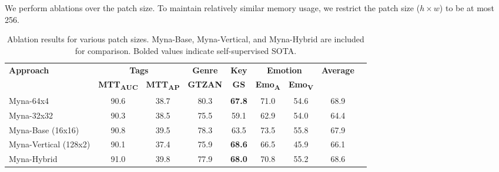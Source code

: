 We perform ablations over the patch size. To maintain relatively similar memory usage, we restrict the patch size ($h \times w$) to be at most 256. 

\begin{table*}[h]
\centering
\begin{tabular}{lcccccccc}
\toprule
\textbf{Approach} & \multicolumn{2}{c}{\textbf{Tags}} & \textbf{Genre} & \textbf{Key} & \multicolumn{2}{c}{\textbf{Emotion}} & \textbf{Average} \\
                  & \textbf{MTT\textsubscript{AUC}} & \textbf{MTT\textsubscript{AP}} & \textbf{GTZAN} & \textbf{GS} & \textbf{Emo\textsubscript{A}} & \textbf{Emo\textsubscript{V}} &  \\
\midrule
\midrule
Myna-64x4 & 90.6 & 38.7 & 80.3 & \textbf{67.8} & 71.0 & 54.6 & 68.9 \\
Myna-32x32 & 90.3 & 38.5 & 75.5 & 59.1 & 62.9 & 54.0 & 64.4 \\
\midrule
Myna-Base (16x16) & 90.8 & 39.5 & 78.3 & 63.5 & 73.5 & 55.8 & 67.9 \\
Myna-Vertical (128x2) & 90.1 & 37.4 & 75.9 & \textbf{68.6} & 66.5 & 45.9 & 66.1 \\
Myna-Hybrid & 91.0 & 39.8 & 77.9 & \textbf{68.0} & 70.8 & 55.2 & 68.6 \\ %

\bottomrule
\end{tabular}
\caption{Ablation results for various patch sizes. Myna-Base, Myna-Vertical, and Myna-Hybrid are included for comparison. Bolded values indicate self-supervised SOTA.}
\end{table*}